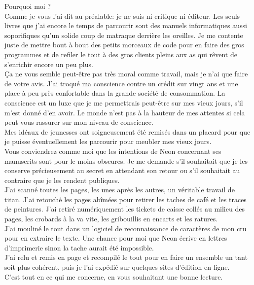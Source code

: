 Pourquoi moi ? \\
Comme je vous l'ai dit au préalable: je ne suis ni critique ni éditeur. Les seuls livres que j'ai encore le temps de parcourir sont des manuels informatiques aussi soporifiques qu'un solide coup de matraque derrière les oreilles. Je me contente juste de mettre bout à bout des petits morceaux de code pour en faire des gros programmes et de refiler le tout à des gros clients pleins aux as qui rêvent de s'enrichir encore un peu plus. \\
Ça ne vous semble peut-être pas très moral comme travail, mais je n'ai que faire de votre avis. J'ai troqué ma conscience contre un crédit sur vingt ans et une place à peu près confortable dans la grande société de consommation. La conscience est un luxe que je me permettrais peut-être sur mes vieux jours, s'il m'est donné d'en avoir. Le monde n'est pas à la hauteur de mes attentes si cela peut vous rassurer sur mon niveau de conscience. \\
Mes idéaux de jeunesses ont soigneusement été remisés dans un placard pour que je puisse éventuellement les parcourir pour meubler mes vieux jours.\\

Vous conviendrez comme moi que les intentions de Neon concernant ses manuscrits sont pour le moins obscures. Je me demande s'il souhaitait que je les conserve précieusement au secret en attendant son retour ou s'il souhaitait au contraire que je les rendent publiques. \\

J'ai scanné toutes les pages, les unes après les autres, un véritable travail de titan. J'ai retouché les pages abîmées pour retirer les taches de café et les traces de peintures. J'ai retiré numériquement les tickets de caisse collés au milieu des pages, les crobards à la va vite, les gribouillis en encarts et les ratures. \\
J'ai mouliné le tout dans un logiciel de reconnaissance de caractères de mon cru pour en extraire le texte. Une chance pour moi que Neon écrive en lettres d'imprimerie sinon la tache aurait été impossible. \\
J'ai relu et remis en page et recompilé le tout pour en faire un ensemble un tant soit plus cohérent, puis je l'ai expédié sur quelques sites d'édition en ligne. \\

C'est tout en ce qui me concerne, en vous souhaitant une bonne lecture.